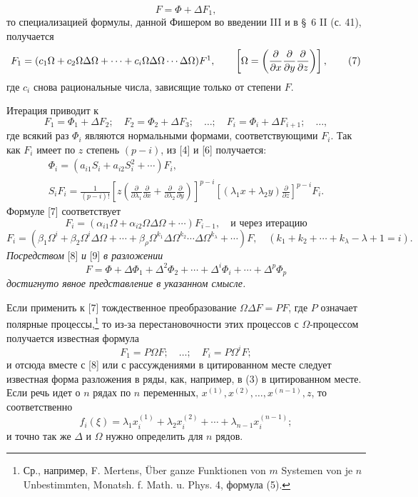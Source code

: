 \documentclass[11pt]{article}
\providecommand{\p}{\partial}
\begin{document}
\begin{equation}
        F=\Phi+\Delta F_1,
\tag{2a}
\end{equation}
то специализацией формулы, данной Фишером во введении III и в \S~6 II (с. 41), получается
\begin{equation}
        F_1=(c_1\Omega+c_2\Omega\Delta\Omega+\cdots+c_i\Omega\Delta\Omega\cdots\Delta\Omega)F\footnotemark,
        \qquad \left[\Omega=\left(\frac{\p}{\p x}\frac{\p}{\p y}\frac{\p}{\p z}\right)\right],
\tag{7}
\end{equation}
где \(c_i\) снова рациональные числа, зависящие только от степени \(F\).

Итерация приводит к
\[
        F_1=\Phi_1+\Delta F_2;\quad F_2=\Phi_2+\Delta F_3;\quad\ldots;\quad
        F_i=\Phi_i+\Delta F_{i+1};\quad\ldots,
\]
где всякий раз \(\Phi_i\) являются нормальными формами, соответствующими \(F_i\). Так как \(F_i\) имеет по \(z\) степень \((p-i)\), из [4] и [6] получается:
\begin{equation}
\begin{gathered}
        \Phi_i=(a_{i1}S_i+a_{i2}S_i^2+\cdots)F_i,\\
        S_iF_i=\frac1{(p-i)!}
        \left[z\left(\frac{\p}{\p\lambda_1}\frac{\p}{\p x}+
        \frac{\p}{\p\lambda_2}\frac{\p}{\p y}\right)\right]^{p-i}
        \left[(\lambda_1x+\lambda_2y)\frac{\p}{\p z}\right]^{p-i}F_i.
\end{gathered}
\tag{8}
\end{equation}
Формуле [7] соответствует
\[
        F_i=(\alpha_{i1}\Omega+\alpha_{i2}\Omega\Delta\Omega+\cdots)F_{i-1},
        \quad\text{и через итерацию}
\]
\begin{equation}
        F_i=(\beta_1\Omega^i+\beta_2\Omega^i\Delta\Omega+\cdots
        +\beta_\rho\Omega^{k_1}\Delta\Omega^{k_2}\cdots\Delta\Omega^{k_\lambda}+\cdots)F,
        \quad(k_1+k_2+\cdots+k_\lambda-\lambda+1=i).
\tag{9}
\end{equation}
\emph{Посредством} [8] \emph{и} [9] \emph{в разложении}
\[
        F=\Phi+\Delta\Phi_1+\Delta^2\Phi_2+\cdots+\Delta^i\Phi_i+\cdots+\Delta^p\Phi_p
\]
\emph{достигнуто явное представление в указанном смысле.}

Если применить к [7] тождественное преобразование \(\Omega\Delta F=PF\), где \(P\) означает полярные процессы,\footnote{Ср., например, F. Mertens, Über ganze Funktionen von \(m\) Systemen von je \(n\) Unbestimmten, Monatsh. f. Math. u. Phys. 4, формула (5).} то из-за перестановочности этих процессов с \(\Omega\)-процессом получается известная формула
\[
        F_1=P\Omega F;\quad\ldots;\quad F_i=P\Omega^iF;
\]
и отсюда вместе с [8] или с рассуждениями в цитированном месте следует известная форма разложения в ряды, как, например, в (3) в цитированном месте. Если речь идет о \(n\) рядах по \(n\) переменных, \(x^{(1)},x^{(2)},\ldots,x^{(n-1)},z\), то соответственно
\[
        f_i(\xi)=\lambda_1x_i^{(1)}+\lambda_2x_i^{(2)}+\cdots+\lambda_{n-1}x_i^{(n-1)};
\]
и точно так же \(\Delta\) и \(\Omega\) нужно определить для \(n\) рядов.
\end{document}
